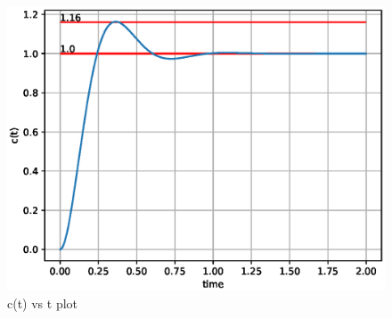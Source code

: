 \begin{enumerate}[label=\thesubsection.\arabic*.,ref=\thesubsection.\theenumi]
\begin{figure}[!h]
    \centering
    \includegraphics[width=\columnwidth]{figs/ee18btech11045/ee18btech11045.eps}
    \caption{c(t) vs t plot}
    \label{fig:ee18btech11028_fig1}
\end{figure}

\end{enumerate}